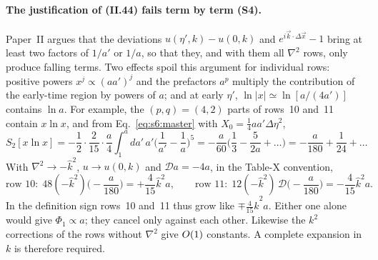 \documentclass[aps,prd,onecolumn,10pt,nofootinbib,floatfix]{revtex4-2}
\newcommand{\PII}{Paper~II}
\newcommand{\eqII}[1]{(II.#1)}
\newcommand{\Dop}{\mathcal{D}}
\newcommand{\khat}{\hat k}
\begin{document}
\paragraph*{The justification of \eqII{44} fails term by term (S4).}
\PII{} argues that the deviations $u(\eta',k)-u(0,k)$ and $e^{i\vec k\cdot\Delta\vec x}-1$ bring at least two factors of
$1/a'$ or $1/a$, so that they, and with them all $\nabla^2$ rows, only produce falling terms. Two effects spoil this
argument for individual rows: positive powers $x^j\propto(aa')^j$ and the prefactors $a^p$ multiply the contribution of
the early-time region by powers of $a$; and at early $\eta'$, $\ln|x|\simeq\ln[a/(4a')]$ contains $\ln a$. For example,
the $(p,q)=(4,2)$ parts of rows~10 and~11 contain $x\ln x$, and from Eq.~\eqref{eq:s6:master} with $X_0=\frac14aa'\Delta\eta^2$,
\begin{equation}
S_2[x\ln x]=-\frac12\cdot\frac2{15}\cdot\frac a4\int_1^a\!da'\,a'\Big(\frac1{a'}-\frac1a\Big)^5
=-\frac a{60}\Big(\frac13-\frac5{2a}+\ldots\Big)=-\frac a{180}+\frac1{24}+\ldots
\label{eq:s6:S2xlnx}
\end{equation}
With $\nabla^2\to-\khat^2$, $u\to u(0,k)$ and $\Dop a=-4a$, in the Table-X convention,
\begin{equation}
\text{row 10:}\ \ 48(-\khat^2)\Big(-\frac a{180}\Big)=+\frac4{15}\khat^2a,\qquad
\text{row 11:}\ \ 12(-\khat^2)\,\Dop\Big(-\frac a{180}\Big)=-\frac4{15}\khat^2a .
\label{eq:s6:row1011}
\end{equation}
In the definition sign rows~10 and~11 thus grow like $\mp\frac4{15}\khat^2a$. Either one alone would give
$\Phi_1\propto a$; they cancel only against each other. Likewise the $k^2$ corrections of the rows without $\nabla^2$
give $O(1)$ constants. A complete expansion in $k$ is therefore required.
\end{document}
